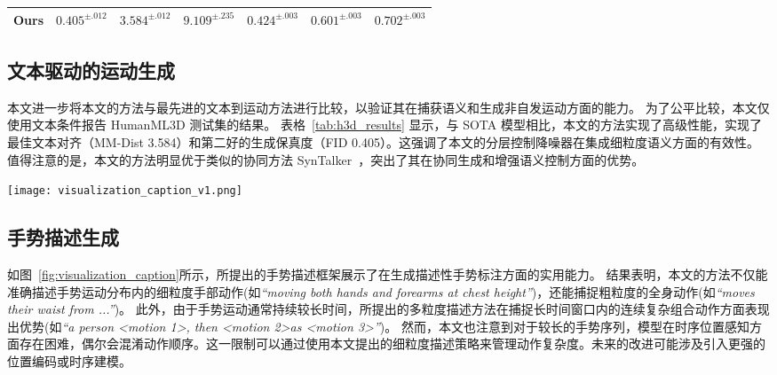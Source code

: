 \begin{table*}[t]
\begin{tabular}{c cccccc}
  Ours  & $0.405^{\pm .012}$ & $3.584^{\pm .012}$ & $9.109^{\pm .235}$  & $0.424^{\pm .003}$ &$0.601^{\pm .003}$ & $0.702^{\pm .003}$ \\
  \bottomrule
  \end{tabular}
\end{table*}

\subsection{文本驱动的运动生成}
\label{sec:exp_t2m}
本文进一步将本文的方法与最先进的文本到运动方法进行比较，以验证其在捕获语义和生成非自发运动方面的能力。
为了公平比较，本文仅使用文本条件报告 HumanML3D 测试集的结果。
表格~\ref{tab:h3d_results} 显示，与 SOTA 模型相比，本文的方法实现了高级性能，实现了最佳文本对齐（MM-Dist 3.584）和第二好的生成保真度（FID 0.405）。这强调了本文的分层控制降噪器在集成细粒度语义方面的有效性。
值得注意的是，本文的方法明显优于类似的协同方法 SynTalker~\cite{chen2024syntalker}，突出了其在协同生成和增强语义控制方面的优势。


\begin{figure*}[t]
  \centering
  \texttt{[image: visualization\_caption\_v1.png]}
  \caption{手势描述生成结果示例。生成的描述准确地描述了整体运动模式和细粒度的手势细节。}
  \label{fig:visualization_caption}
\end{figure*}
\subsection{手势描述生成}
如图~\ref{fig:visualization_caption}所示，所提出的手势描述框架展示了在生成描述性手势标注方面的实用能力。
结果表明，本文的方法不仅能准确描述手势运动分布内的细粒度手部动作(如\textit{``moving both hands and forearms at chest height''})，还能捕捉粗粒度的全身动作(如\textit{``moves their waist from ...''})。
此外，由于手势运动通常持续较长时间，所提出的多粒度描述方法在捕捉长时间窗口内的连续复杂组合动作方面表现出优势(如\textit{``a person \textless motion 1\textgreater, then \textless motion 2\textgreater as \textless motion 3\textgreater''})。
然而，本文也注意到对于较长的手势序列，模型在时序位置感知方面存在困难，偶尔会混淆动作顺序。这一限制可以通过使用本文提出的细粒度描述策略来管理动作复杂度。未来的改进可能涉及引入更强的位置编码或时序建模。

